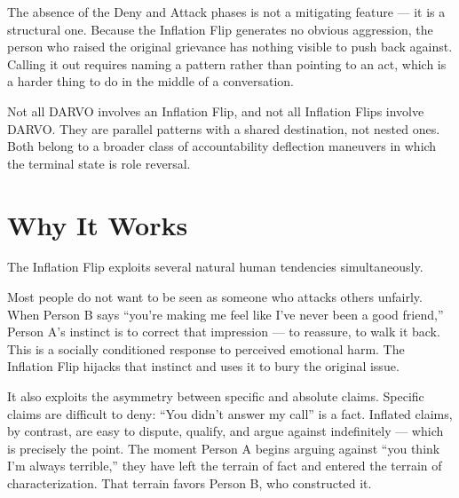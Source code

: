 \begin{remark}
The absence of the Deny and Attack phases is not a mitigating feature --- it is a structural one.
Because the Inflation Flip generates no obvious aggression, the person who raised the original grievance has nothing visible to push back against.
Calling it out requires naming a pattern rather than pointing to an act, which is a harder thing to do in the middle of a conversation.
\end{remark}

\begin{remark}
Not all DARVO involves an Inflation Flip, and not all Inflation Flips involve DARVO.
They are parallel patterns with a shared destination, not nested ones.
Both belong to a broader class of accountability deflection maneuvers in which the terminal state is role reversal.
\end{remark}

\section{Why It Works}

The Inflation Flip exploits several natural human tendencies simultaneously.

Most people do not want to be seen as someone who attacks others unfairly.
When Person B says ``you're making me feel like I've never been a good friend,'' Person A's instinct is to correct that impression --- to reassure, to walk it back.
This is a socially conditioned response to perceived emotional harm.
The Inflation Flip hijacks that instinct and uses it to bury the original issue.

It also exploits the asymmetry between specific and absolute claims.
Specific claims are difficult to deny: ``You didn't answer my call'' is a fact.
Inflated claims, by contrast, are easy to dispute, qualify, and argue against indefinitely --- which is precisely the point.
The moment Person A begins arguing against ``you think I'm always terrible,'' they have left the terrain of fact and entered the terrain of characterization.
That terrain favors Person B, who constructed it.


